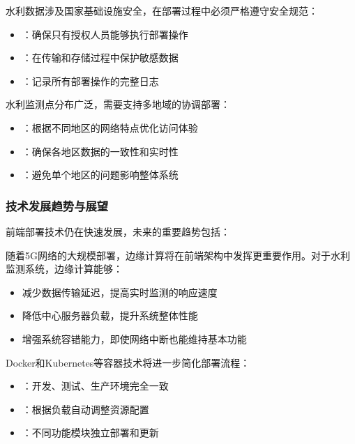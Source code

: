 
水利数据涉及国家基础设施安全，在部署过程中必须严格遵守安全规范：

\begin{itemize}
\tightlist
\item
  ：确保只有授权人员能够执行部署操作
\item
  ：在传输和存储过程中保护敏感数据
\item
  ：记录所有部署操作的完整日志
\end{itemize}


水利监测点分布广泛，需要支持多地域的协调部署：

\begin{itemize}
\tightlist
\item
  ：根据不同地区的网络特点优化访问体验
\item
  ：确保各地区数据的一致性和实时性
\item
  ：避免单个地区的问题影响整体系统
\end{itemize}

\hypertarget{ux6280ux672fux53d1ux5c55ux8d8bux52bfux4e0eux5c55ux671b}{%
\subsubsection{技术发展趋势与展望}\label{ux6280ux672fux53d1ux5c55ux8d8bux52bfux4e0eux5c55ux671b}}

前端部署技术仍在快速发展，未来的重要趋势包括：


随着5G网络的大规模部署，边缘计算将在前端架构中发挥更重要作用。对于水利监测系统，边缘计算能够：

\begin{itemize}
\tightlist
\item
  减少数据传输延迟，提高实时监测的响应速度
\item
  降低中心服务器负载，提升系统整体性能
\item
  增强系统容错能力，即使网络中断也能维持基本功能
\end{itemize}


Docker和Kubernetes等容器技术将进一步简化部署流程：

\begin{itemize}
\tightlist
\item
  ：开发、测试、生产环境完全一致
\item
  ：根据负载自动调整资源配置
\item
  ：不同功能模块独立部署和更新
\end{itemize}

